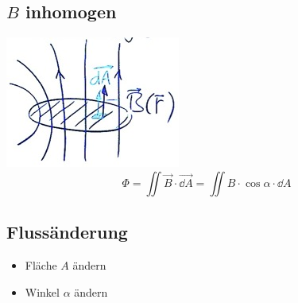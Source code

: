 \subsection{\texorpdfstring{$B$}{B} inhomogen}
\includegraphics{Bild210} \\
\[ \Phi = \iint \vec{B} \cdot \vec{\dd A} = \iint B \cdot \cos \alpha \cdot \dd A \]

\subsection{Flussänderung}
\begin{itemize}
	\item Fläche $A$ ändern
	\item Winkel $\alpha$ ändern
\end{itemize} 
